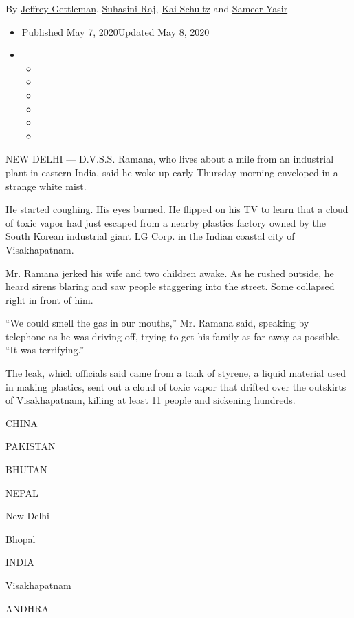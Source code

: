 By \href{https://www.nytimes.com/by/jeffrey-gettleman}{Jeffrey
Gettleman}, \href{https://www.nytimes.com/by/suhasini-raj}{Suhasini
Raj}, \href{https://www.nytimes.com/by/kai-schultz}{Kai Schultz} and
\href{https://www.nytimes.com/by/sameer-yasir}{Sameer Yasir}

\begin{itemize}
\item
  Published May 7, 2020Updated May 8, 2020
\item
  \begin{itemize}
  \item
  \item
  \item
  \item
  \item
  \item
  \end{itemize}
\end{itemize}

NEW DELHI --- D.V.S.S. Ramana, who lives about a mile from an industrial
plant in eastern India, said he woke up early Thursday morning enveloped
in a strange white mist.

He started coughing. His eyes burned. He flipped on his TV to learn that
a cloud of toxic vapor had just escaped from a nearby plastics factory
owned by the South Korean industrial giant LG Corp. in the Indian
coastal city of Visakhapatnam.

Mr. Ramana jerked his wife and two children awake. As he rushed outside,
he heard sirens blaring and saw people staggering into the street. Some
collapsed right in front of him.

``We could smell the gas in our mouths,'' Mr. Ramana said, speaking by
telephone as he was driving off, trying to get his family as far away as
possible. ``It was terrifying.''

The leak, which officials said came from a tank of styrene, a liquid
material used in making plastics, sent out a cloud of toxic vapor that
drifted over the outskirts of Visakhapatnam, killing at least 11 people
and sickening hundreds.

CHINA

PAKISTAN

BHUTAN

NEPAL

New Delhi

Bhopal

INDIA

Visakhapatnam ~~~~

ANDHRA

